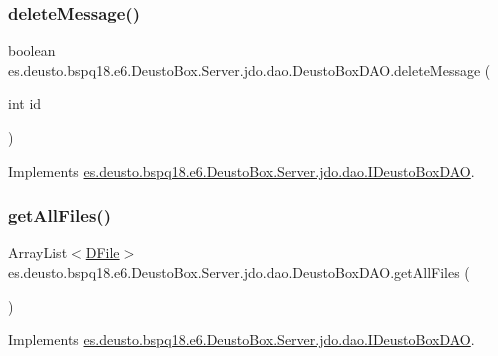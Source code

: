 \subsubsection{\texorpdfstring{delete\+Message()}{deleteMessage()}}
{\footnotesize\ttfamily boolean es.\+deusto.\+bspq18.\+e6.\+Deusto\+Box.\+Server.\+jdo.\+dao.\+Deusto\+Box\+D\+A\+O.\+delete\+Message (\begin{DoxyParamCaption}\item[{int}]{id }\end{DoxyParamCaption})}



Implements \mbox{\hyperlink{interfacees_1_1deusto_1_1bspq18_1_1e6_1_1_deusto_box_1_1_server_1_1jdo_1_1dao_1_1_i_deusto_box_d_a_o_ad7d7a9d742eeb1a52f7de1e37481311b}{es.\+deusto.\+bspq18.\+e6.\+Deusto\+Box.\+Server.\+jdo.\+dao.\+I\+Deusto\+Box\+D\+AO}}.

\mbox{\label{classes_1_1deusto_1_1bspq18_1_1e6_1_1_deusto_box_1_1_server_1_1jdo_1_1dao_1_1_deusto_box_d_a_o_afe1ece43464200c0c300f3eac92d728e}} 
\subsubsection{\texorpdfstring{get\+All\+Files()}{getAllFiles()}}
{\footnotesize\ttfamily Array\+List$<$\mbox{\hyperlink{classes_1_1deusto_1_1bspq18_1_1e6_1_1_deusto_box_1_1_server_1_1jdo_1_1data_1_1_d_file}{D\+File}}$>$ es.\+deusto.\+bspq18.\+e6.\+Deusto\+Box.\+Server.\+jdo.\+dao.\+Deusto\+Box\+D\+A\+O.\+get\+All\+Files (\begin{DoxyParamCaption}{ }\end{DoxyParamCaption})}



Implements \mbox{\hyperlink{interfacees_1_1deusto_1_1bspq18_1_1e6_1_1_deusto_box_1_1_server_1_1jdo_1_1dao_1_1_i_deusto_box_d_a_o_a1b64a2f73f852c4bc0cf63f97c71914f}{es.\+deusto.\+bspq18.\+e6.\+Deusto\+Box.\+Server.\+jdo.\+dao.\+I\+Deusto\+Box\+D\+AO}}.

